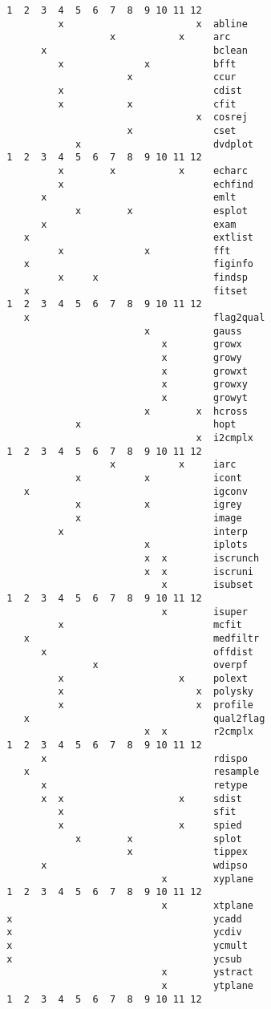 \begin{verbatim}
 1  2  3  4  5  6  7  8  9 10 11 12
          x                       x  abline
                   x           x     arc
       x                             bclean
          x              x           bfft
                      x              ccur
          x                          cdist
          x           x              cfit
                                  x  cosrej
                      x              cset
             x                       dvdplot
 1  2  3  4  5  6  7  8  9 10 11 12
          x        x           x     echarc
          x                          echfind
       x                             emlt
             x        x              esplot
       x                             exam
    x                                extlist
          x              x           fft
    x                                figinfo
          x     x                    findsp
    x                                fitset
 1  2  3  4  5  6  7  8  9 10 11 12
    x                                flag2qual
                         x           gauss
                            x        growx
                            x        growy
                            x        growxt
                            x        growxy
                            x        growyt
                         x        x  hcross
             x                       hopt
                                  x  i2cmplx
 1  2  3  4  5  6  7  8  9 10 11 12
                   x           x     iarc
             x           x           icont
    x                                igconv
             x           x           igrey
             x                       image
          x                          interp
                         x           iplots
                         x  x        iscrunch
                         x  x        iscruni
                            x        isubset
 1  2  3  4  5  6  7  8  9 10 11 12
                            x        isuper
          x                          mcfit
    x                                medfiltr
       x                             offdist
                x                    overpf
          x                    x     polext
          x                       x  polysky
          x                       x  profile
    x                                qual2flag
                         x  x        r2cmplx
 1  2  3  4  5  6  7  8  9 10 11 12
       x                             rdispo
    x                                resample
       x                             retype
       x  x                    x     sdist
          x                          sfit
          x                    x     spied
             x        x              splot
                      x              tippex
       x                             wdipso
                            x        xyplane
 1  2  3  4  5  6  7  8  9 10 11 12
                            x        xtplane
 x                                   ycadd
 x                                   ycdiv
 x                                   ycmult
 x                                   ycsub
                            x        ystract
                            x        ytplane
 1  2  3  4  5  6  7  8  9 10 11 12
\end{verbatim}

